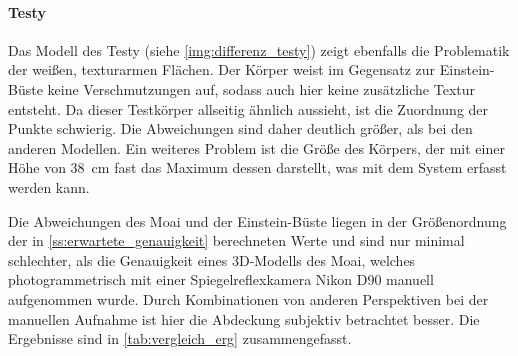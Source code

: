 \documentclass[./00PhotoBox.tex]{subfiles}
\begin{document}
\paragraph{Testy}
Das Modell des Testy (siehe \autoref{img:differenz_testy}) zeigt ebenfalls die Problematik der weißen, texturarmen Flächen. Der Körper weist im Gegensatz zur Einstein-Büste keine Verschmutzungen auf, sodass auch hier keine zusätzliche Textur entsteht. Da dieser Testkörper allseitig ähnlich aussieht, ist die Zuordnung der Punkte schwierig. Die Abweichungen sind daher deutlich größer, als bei den anderen Modellen. Ein weiteres Problem ist die Größe des Körpers, der mit einer Höhe von \SI{38}{\centi\metre} fast das Maximum dessen darstellt, was mit dem System erfasst werden kann.

Die Abweichungen des Moai und der Einstein-Büste liegen in der Größenordnung der in \autoref{ss:erwartete_genauigkeit} berechneten Werte und sind nur minimal schlechter, als die Genauigkeit eines 3D-Modells des Moai, welches photogrammetrisch mit einer Spiegelreflexkamera Nikon D90 manuell aufgenommen wurde. Durch Kombinationen von anderen Perspektiven bei der manuellen Aufnahme ist hier die Abdeckung subjektiv betrachtet besser. Die Ergebnisse sind in \autoref{tab:vergleich_erg} zusammengefasst.
\end{document}

